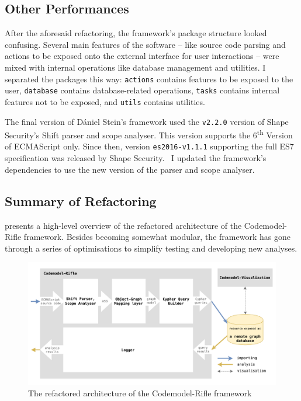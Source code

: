 \subsection{Other Performances}

After the aforesaid refactoring, the framework's package structure looked confusing. Several main features of the software – like source code parsing and actions to be exposed onto the external interface for user interactions – were mixed with internal operations like database management and utilities. I separated the packages this way: \texttt{actions} contains features to be exposed to the user, \texttt{database} contains database-related operations, \texttt{tasks} contains internal features not to be exposed, and \texttt{utils} contains utilities.

The final version of Dániel Stein's framework used the \texttt{v2.2.0} version of Shape Security's Shift parser and scope analyser. This version supports the 6\textsuperscript{th} Version of ECMAScript only. Since then, version \texttt{es2016-v1.1.1} supporting the full ES7 specification was released by Shape Security.~\cite{shift-ast, shift-java-github} I updated the framework's dependencies to use the new version of the parser and scope analyser.

\subsection{Summary of Refactoring}

 presents a high-level overview of the refactored architecture of the Codemodel-Rifle framework. Besides becoming somewhat modular, the framework has gone through a series of optimisations to simplify testing and developing new analyses.

\begin{figure}[!htb]
	\centering
	\includegraphics[width=\textwidth, trim=3mm 3mm 3mm 3mm,clip]{figures/codemodel-rifle-refactored-architecture.pdf}
	\caption{The refactored architecture of the Codemodel-Rifle framework}
	\label{fig:codemodel-rifle-refactored-architecture}
\end{figure}


